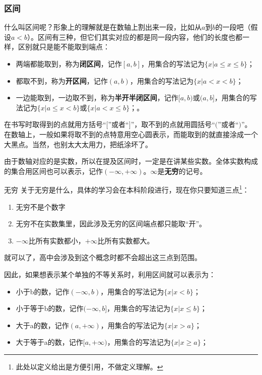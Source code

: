 \subsubsection{区间}

什么叫区间呢？形象上的理解就是在数轴上割出来一段，比如从$a$到$b$的一段吧（假设$a<b$）。区间有三种，但它们其实对应的都是同一段内容，他们的长度也都一样，区别就只是能不能取到端点：
\begin{itemize}
\item 两端都能取到，称为\textbf{闭区间}，记作$[a,b]$，用集合的写法记为$\{x|a\leq x\leq b\}$；
\item 都取不到，称为\textbf{开区间}，记作$(a,b)$，用集合的写法记为$\{x|a< x<b\}$；
\item 一边能取到，一边取不到，称为\textbf{半开半闭区间}，记作$[a,b)$或$(a,b]$，用集合的写法记为$\{x|a\leq x< b\}$或$\{x|a< x\leq b\}$；。
\end{itemize}
在书写时取得到的点就用方括号“$[$”或者“$]$”，取不到的点就用圆括号“$($”或者“$)$”。
在数轴上，一般如果将取不到的点特意用空心圆表示，而能取到的就直接涂成一个大黑点。当然，也别太大太用力，把纸涂坏了。
\addTODO{画个数轴的图，[-1,2)的区间}

由于数轴对应的是实数，所以在提及区间时，一定是在讲某些实数。全体实数构成的集合用区间也可以表示，记作$(-\infty,+\infty)$。$\infty$是\textbf{无穷}的记号。
\begin{definition}{无穷}
关于无穷是什么，具体的学习会在本科阶段进行，现在你只要知道三点\footnote{此处以定义给出是方便引用，不做定义理解。}：
\begin{enumerate}
\item 无穷不是个数字
\item 无穷不在实数集里，因此涉及无穷的区间端点都只能取“开”。
\item $-\infty$比所有实数都小，$+\infty$比所有实数都大。
\end{enumerate}
就可以了，高中会涉及到这个概念时都不会超出这三点到范围。
\end{definition}

因此，如果想表示某个单独的不等关系时，利用区间就可以表示为：
\begin{itemize}
\item 小于b的数，记作$(-\infty,b)$，用集合的写法记为$\{x|x< b\}$；
\item 小于等于b的数，记作$(-\infty,b]$，用集合的写法记为$\{x|x\leq b\}$；
\item 大于a的数，记作$(a,+\infty)$，用集合的写法记为$\{x|x> a\}$；
\item 大于等于a的数，记作$[a,+\infty)$，用集合的写法记为$\{x|x\geq a\}$；
\end{itemize}

